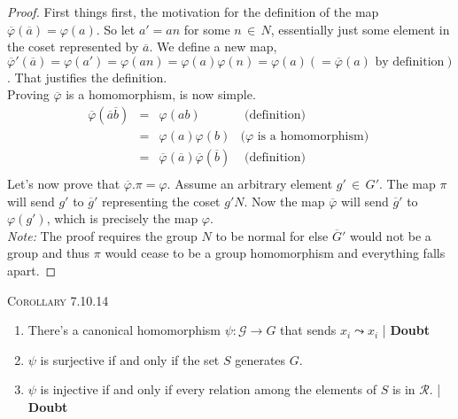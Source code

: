 \documentclass[12pt]{article}
\begin{document}
\begin{proof}
First things first, the motivation for the definition of the map $\overline \varphi (\overline a) = \varphi (a)$. So let $a'=an$ for some $n\, \in \, N$, essentially just some element in the coset represented by $\overline a$. We define a new map, $\overline \varphi' (\overline a) = \varphi (a') = \varphi (an) = \varphi(a) \varphi (n) = \varphi (a) (= \overline \varphi (a) \text{ by definition})$. That justifies the definition.\\
Proving $\overline \varphi$ is a homomorphism, is now simple. 
\begin{equation*}
\begin{array}{lclr}
\overline \varphi (\overline a \overline b) & = &  \varphi(ab) & \text{ (definition) }\\
 & = &  \varphi(a) \varphi (b) &  (\varphi \text{ is a homomorphism) }\\
 & = &  \overline \varphi( \overline a) \overline \varphi ( \overline b) & \text{ (definition) }\\
\end{array}
\end{equation*}
Let's now prove that $\overline \varphi . \pi = \varphi$. Assume an arbitrary element $g' \, \in \, G'$. The map $\pi$ will send $g'$ to $\overline g'$ representing the coset $g'N$. Now the map $\overline \varphi$ will send $\overline g'$ to $\varphi (g')$, which is precisely the map $\varphi$.\\
\emph {Note:} The proof requires the group $N$ to be normal for else $\overline G'$ would not be a group and thus $\pi$ would cease to be a group homomorphism and everything falls apart.
\end{proof}
\textsc {Corollary 7.10.14}
\begin{enumerate}[(1)]
\item There's a canonical homomorphism $\psi: \mathcal G \rightarrow G$ that sends $x_{i} \leadsto x_{i}$ | \textbf {Doubt}
\item $\psi$ is surjective if and only if the set $S$ generates $G$.
\item $\psi$ is injective if and only if every relation among the elements of $S$ is in $\mathcal R$. | \textbf {Doubt}
\end{enumerate}
\end{document}
